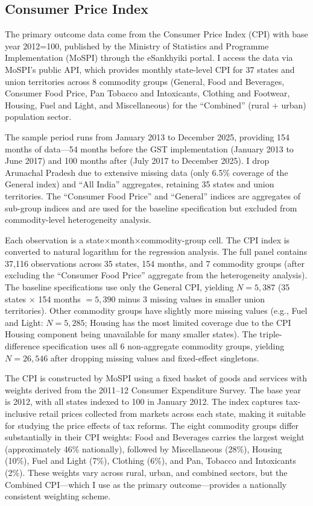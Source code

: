 \documentclass[12pt]{article}
\begin{document}
\subsection{Consumer Price Index}

The primary outcome data come from the Consumer Price Index (CPI) with base year 2012=100, published by the Ministry of Statistics and Programme Implementation (MoSPI) through the eSankhyiki portal. I access the data via MoSPI's public API, which provides monthly state-level CPI for 37 states and union territories across 8 commodity groups (General, Food and Beverages, Consumer Food Price, Pan Tobacco and Intoxicants, Clothing and Footwear, Housing, Fuel and Light, and Miscellaneous) for the ``Combined'' (rural + urban) population sector.

The sample period runs from January 2013 to December 2025, providing 154 months of data---54 months before the GST implementation (January 2013 to June 2017) and 100 months after (July 2017 to December 2025). I drop Arunachal Pradesh due to extensive missing data (only 6.5\% coverage of the General index) and ``All India'' aggregates, retaining 35 states and union territories. The ``Consumer Food Price'' and ``General'' indices are aggregates of sub-group indices and are used for the baseline specification but excluded from commodity-level heterogeneity analysis.

Each observation is a state$\times$month$\times$commodity-group cell. The CPI index is converted to natural logarithm for the regression analysis. The full panel contains 37,116 observations across 35 states, 154 months, and 7 commodity groups (after excluding the ``Consumer Food Price'' aggregate from the heterogeneity analysis). The baseline specifications use only the General CPI, yielding $N = 5{,}387$ (35 states $\times$ 154 months $= 5{,}390$ minus 3 missing values in smaller union territories). Other commodity groups have slightly more missing values (e.g., Fuel and Light: $N = 5{,}285$; Housing has the most limited coverage due to the CPI Housing component being unavailable for many smaller states). The triple-difference specification uses all 6 non-aggregate commodity groups, yielding $N = 26{,}546$ after dropping missing values and fixed-effect singletons.

The CPI is constructed by MoSPI using a fixed basket of goods and services with weights derived from the 2011--12 Consumer Expenditure Survey. The base year is 2012, with all states indexed to 100 in January 2012. The index captures tax-inclusive retail prices collected from markets across each state, making it suitable for studying the price effects of tax reforms. The eight commodity groups differ substantially in their CPI weights: Food and Beverages carries the largest weight (approximately 46\% nationally), followed by Miscellaneous (28\%), Housing (10\%), Fuel and Light (7\%), Clothing (6\%), and Pan, Tobacco and Intoxicants (2\%). These weights vary across rural, urban, and combined sectors, but the Combined CPI---which I use as the primary outcome---provides a nationally consistent weighting scheme.
\end{document}
